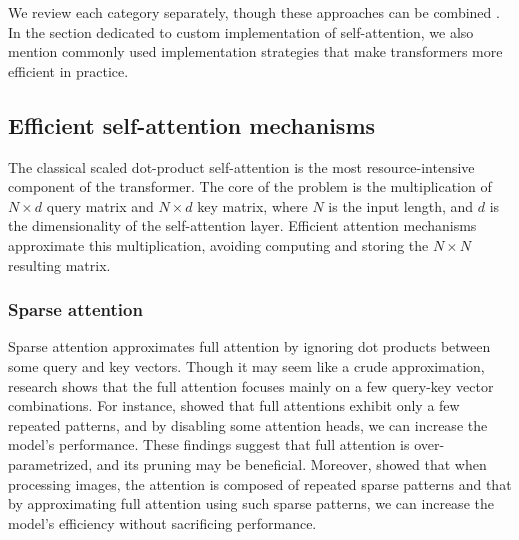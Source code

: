 We review each category separately, though these approaches can be
combined \citep{child2019generating,beltagy2020longformer}. In the section
dedicated to custom implementation of self-attention, we also mention commonly
used implementation strategies that make transformers more efficient in
practice.

\subsection{Efficient self-attention mechanisms}\label{section:efficient_self_attn}


The classical scaled dot-product self-attention \citep{vaswani2017attention} is
the most resource-intensive component of the transformer. The core of the
problem is the multiplication of $N\times d$ query matrix and $N\times d$ key
matrix, where $N$ is the input length, and $d$ is the dimensionality of the
self-attention layer. Efficient attention mechanisms approximate this
multiplication, avoiding computing and storing the $N\times N$ resulting
matrix.

\subsubsection{Sparse attention}

Sparse attention approximates full attention by ignoring dot products between
some query and key vectors. Though it may seem like a crude approximation,
research shows that the full attention focuses mainly on a few query-key vector
combinations. For instance, \cite{kovaleva2019revealing} showed that full
attentions exhibit only a few repeated patterns, and by disabling some attention
heads, we can increase the model's performance. These findings suggest that full
attention is over-parametrized, and its pruning may be beneficial. Moreover,
\cite{child2019generating} showed that when processing images, the attention is
composed of repeated sparse patterns and that by approximating full attention
using such sparse patterns, we can increase the model's efficiency without
sacrificing performance.

